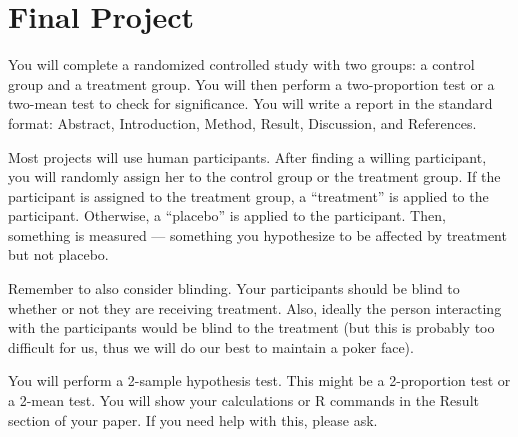 \documentclass[12pt,letterpaper]{article}
\begin{document}
\section*{Final Project}

You will complete a randomized controlled study with two groups: a control group and a treatment group. You will then perform a two-proportion test or a two-mean test to check for significance. You will write a report in the standard format: Abstract, Introduction, Method, Result, Discussion, and References.

Most projects will use human participants. After finding a willing participant, you will randomly assign her to the control group or the treatment group. If the participant is assigned to the treatment group, a ``treatment'' is applied to the participant. Otherwise, a ``placebo'' is applied to the participant. Then, something is measured --- something you hypothesize to be affected by treatment but not placebo.

Remember to also consider blinding. Your participants should be blind to whether or not they are receiving treatment. Also, ideally the person interacting with the participants would be blind to the treatment (but this is probably too difficult for us, thus we will do our best to maintain a poker face).

You will perform a 2-sample hypothesis test. This might be a 2-proportion test or a 2-mean test. You will show your calculations or R commands in the Result section of your paper. If you need help with this, please ask.
\end{document}
